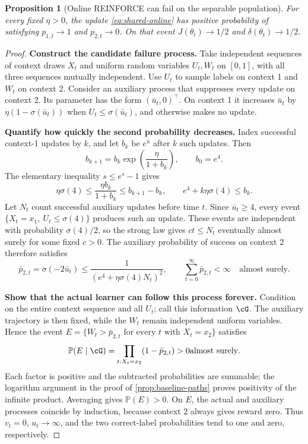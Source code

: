 \documentclass[11pt,twoside]{article}
\renewcommand{\P}{\mathbb P}
\newtheorem{proposition}[theorem]{Proposition}
\theoremstyle{definition}
\theoremstyle{remark}
\begin{document}
\begin{proposition}[Online REINFORCE can fail on the separable population]
\label{prop:shared-online}
For every fixed $\eta>0$, the update \cref{eq:shared-online} has positive
probability of satisfying $p_{1,t}\to1$ and $p_{2,t}\to0$.
On that event $J(\theta_t)\to1/2$ and $\delta(\theta_t)\to1/2$.
\end{proposition}
\begin{proof}
\textbf{Construct the candidate failure process.}
Take independent sequences of context draws $X_t$ and uniform random
variables $U_t,W_t$ on $[0,1]$, with all three sequences mutually
independent. Use $U_t$ to sample labels on context 1 and $W_t$ on context 2.
Consider an auxiliary process that suppresses every update on context 2.
Its parameter has the form $(\bar u_t,0)^\top$. On context 1 it increases
$\bar u_t$ by $\eta(1-\sigma(\bar u_t))$ when
$U_t\le\sigma(\bar u_t)$, and otherwise makes no update.

\textbf{Quantify how quickly the second probability decreases.}
Index successful context-1 updates by $k$, and let $b_k$ be $e^{\bar u}$
after $k$ such updates. Then
\[
 b_{k+1}=b_k\exp\left(\frac{\eta}{1+b_k}\right),
 \qquad b_0=e^4.
\]
The elementary inequality $s\le e^s-1$ gives
\[
 \eta\sigma(4)\le\frac{\eta b_k}{1+b_k}
 \le b_{k+1}-b_k,
 \qquad e^4+k\eta\sigma(4)\le b_k.
\]
Let $N_t$ count successful auxiliary updates before time $t$.
Since $\bar u_t\ge4$, every event
$\{X_t=x_1,\ U_t\le\sigma(4)\}$ produces such an update. These events
are independent with probability $\sigma(4)/2$, so the strong law gives
$ct\le N_t$ eventually almost surely for some fixed $c>0$.
The auxiliary probability of success on context 2 therefore satisfies
\[
 \bar p_{2,t}=\sigma(-2\bar u_t)
 \le\frac1{(e^4+\eta\sigma(4)N_t)^2},
 \qquad \sum_{t=0}^\infty\bar p_{2,t}<\infty
 \quad\text{almost surely}.
\]

\textbf{Show that the actual learner can follow this process forever.}
Condition on the entire context sequence and all $U_t$; call this
information $\cG$. The auxiliary trajectory is then fixed, while the
$W_t$ remain independent uniform variables. Hence the event
$E=\{W_t>\bar p_{2,t}\text{ for every }t\text{ with }X_t=x_2\}$ satisfies
\[
 \P(E\mid\cG)=\prod_{t:X_t=x_2}(1-\bar p_{2,t})>0
 \quad\text{almost surely}.
\]
Each factor is positive and the subtracted probabilities are summable;
the logarithm argument in the proof of \cref{prop:baseline-paths} proves
positivity of the infinite product. Averaging gives $\P(E)>0$.
On $E$, the actual and auxiliary processes coincide by induction, because
context 2 always gives reward zero. Thus $v_t=0$, $u_t\to\infty$, and
the two correct-label probabilities tend to one and zero, respectively.
\end{proof}
\end{document}
